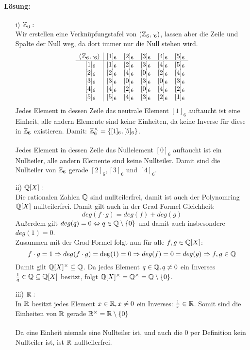 \documentclass[
				a4paper,
				10pt
			]
			{scrartcl}
\begin{document}
\paragraph{L\"osung:}
\begin{itemize}
\item[i)] $\mathbb{Z}_6:$\\
Wir erstellen eine Verkn\"upfungstafel von $(\mathbb{Z}_6, \cdot_6)$, lassen aber die Zeile und Spalte der Null weg, da dort immer nur die Null stehen wird.
$$
\begin{array}{c|c c c c c}
(\mathbb{Z}_6, \cdot_6)& [1]_6 & [2]_6 & [3]_6 & [4]_6 &[5]_6\\
\hline
\ [1]_6 & [1]_6 & [2]_6 & [3]_6 & [4]_6 & [5]_6\\
\ [2]_6 & [2]_6 & [4]_6 & [0]_6 & [2]_6 & [4]_6\\
\ [3]_6 & [3]_6 & [0]_6 & [3]_6 & [0]_6 & [3]_6\\
\ [4]_6 & [4]_6 & [2]_6 & [0]_6 & [4]_6 & [2]_6\\
\ [5]_6 & [5]_6 & [4]_6 & [3]_6 & [2]_6 & [1]_6
\end{array}
$$
Jedes Element in dessen Zeile das neutrale Element $[1]_6$ auftaucht ist eine Einheit, alle andern Elemente sind keine Einheiten, da keine Inverse für diese in $\mathbb{Z}_6$ existieren. Damit: $\mathbb{Z}_6^{\times}=\{[1]_6,[5]_6\}$.\\
\quad\\
Jedes Element in dessen Zeile das Nullelement $[0]_6$ auftaucht ist ein Nullteiler, alle andern Elemente sind keine Nullteiler. Damit sind die Nullteiler von $\mathbb{Z}_6$ gerade $[2]_6,[3]_6$ und $[4]_6$.
\item[ii)] $\mathbb{Q}[X]:$\\
Die rationalen Zahlen $\mathbb{Q}$ sind nullteilerfrei, damit ist auch der Polynomring $\mathbb{Q}[X]$ nullteilerfrei. Damit gilt auch in der Grad-Formel Gleichheit: $$deg(f\cdot g)=deg(f)+deg(g)$$
Au\ss erdem gilt $deg(q)=0 \Leftrightarrow q \in \mathbb{Q}\setminus\{0\}$ und damit auch insbesondere $deg(1)=0$.\\
Zusammen mit der Grad-Formel folgt nun f\"ur alle $f,g \in \mathbb{Q}[X]$:
$$
f\cdot g=1 \Rightarrow deg(f\cdot g)=\deg(1)=0 \Rightarrow deg(f)=0=deg(g) \Rightarrow f,g \in \mathbb{Q}
$$
Damit gilt $\mathbb{Q}[X]^\times \subseteq \mathbb{Q}$. Da jedes Element $q \in \mathbb{Q}, q\ne 0$ ein Inverses $\frac{1}{q}\in\mathbb{Q} \subseteq \mathbb{Q}[X]$ besitzt, folgt $\mathbb{Q}[X]^\times=\mathbb{Q}^\times = \mathbb{Q} \setminus \{0\}$.
\item[iii)] $\mathbb{R}:$\\
In $\mathbb{R}$ besitzt jedes Element $x \in \mathbb{R}, x \ne 0$ ein Inverses: $\frac{1}{x} \in \mathbb{R}$. Somit sind die Einheiten von $\mathbb{R}$ gerade $\mathbb{R}^\times = \mathbb{R} \setminus \{0\}$\\
\quad\\
Da eine Einheit niemals eine Nullteiler ist, und auch die $0$ per Definition kein Nullteiler ist, ist $\mathbb{R}$ nullteilerfrei.
\end{itemize}
\end{document}
